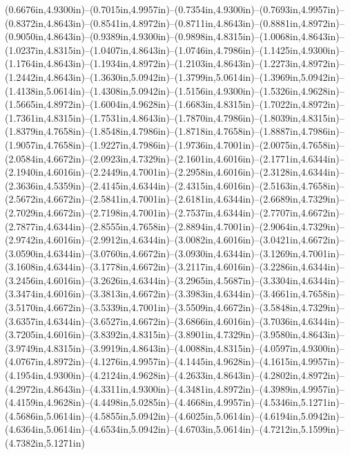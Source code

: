 (0.6676in,4.9300in)--(0.7015in,4.9957in)--(0.7354in,4.9300in)--(0.7693in,4.9957in)--(0.8372in,4.8643in)--(0.8541in,4.8972in)--(0.8711in,4.8643in)--(0.8881in,4.8972in)--(0.9050in,4.8643in)--(0.9389in,4.9300in)--(0.9898in,4.8315in)--(1.0068in,4.8643in)--(1.0237in,4.8315in)--(1.0407in,4.8643in)--(1.0746in,4.7986in)--(1.1425in,4.9300in)--(1.1764in,4.8643in)--(1.1934in,4.8972in)--(1.2103in,4.8643in)--(1.2273in,4.8972in)--(1.2442in,4.8643in)--(1.3630in,5.0942in)--(1.3799in,5.0614in)--(1.3969in,5.0942in)--(1.4138in,5.0614in)--(1.4308in,5.0942in)--(1.5156in,4.9300in)--(1.5326in,4.9628in)--(1.5665in,4.8972in)--(1.6004in,4.9628in)--(1.6683in,4.8315in)--(1.7022in,4.8972in)--(1.7361in,4.8315in)--(1.7531in,4.8643in)--(1.7870in,4.7986in)--(1.8039in,4.8315in)--(1.8379in,4.7658in)--(1.8548in,4.7986in)--(1.8718in,4.7658in)--(1.8887in,4.7986in)--(1.9057in,4.7658in)--(1.9227in,4.7986in)--(1.9736in,4.7001in)--(2.0075in,4.7658in)--(2.0584in,4.6672in)--(2.0923in,4.7329in)--(2.1601in,4.6016in)--(2.1771in,4.6344in)--(2.1940in,4.6016in)--(2.2449in,4.7001in)--(2.2958in,4.6016in)--(2.3128in,4.6344in)--(2.3636in,4.5359in)--(2.4145in,4.6344in)--(2.4315in,4.6016in)--(2.5163in,4.7658in)--(2.5672in,4.6672in)--(2.5841in,4.7001in)--(2.6181in,4.6344in)--(2.6689in,4.7329in)--(2.7029in,4.6672in)--(2.7198in,4.7001in)--(2.7537in,4.6344in)--(2.7707in,4.6672in)--(2.7877in,4.6344in)--(2.8555in,4.7658in)--(2.8894in,4.7001in)--(2.9064in,4.7329in)--(2.9742in,4.6016in)--(2.9912in,4.6344in)--(3.0082in,4.6016in)--(3.0421in,4.6672in)--(3.0590in,4.6344in)--(3.0760in,4.6672in)--(3.0930in,4.6344in)--(3.1269in,4.7001in)--(3.1608in,4.6344in)--(3.1778in,4.6672in)--(3.2117in,4.6016in)--(3.2286in,4.6344in)--(3.2456in,4.6016in)--(3.2626in,4.6344in)--(3.2965in,4.5687in)--(3.3304in,4.6344in)--(3.3474in,4.6016in)--(3.3813in,4.6672in)--(3.3983in,4.6344in)--(3.4661in,4.7658in)--(3.5170in,4.6672in)--(3.5339in,4.7001in)--(3.5509in,4.6672in)--(3.5848in,4.7329in)--(3.6357in,4.6344in)--(3.6527in,4.6672in)--(3.6866in,4.6016in)--(3.7036in,4.6344in)--(3.7205in,4.6016in)--(3.8392in,4.8315in)--(3.8901in,4.7329in)--(3.9580in,4.8643in)--(3.9749in,4.8315in)--(3.9919in,4.8643in)--(4.0088in,4.8315in)--(4.0597in,4.9300in)--(4.0767in,4.8972in)--(4.1276in,4.9957in)--(4.1445in,4.9628in)--(4.1615in,4.9957in)--(4.1954in,4.9300in)--(4.2124in,4.9628in)--(4.2633in,4.8643in)--(4.2802in,4.8972in)--(4.2972in,4.8643in)--(4.3311in,4.9300in)--(4.3481in,4.8972in)--(4.3989in,4.9957in)--(4.4159in,4.9628in)--(4.4498in,5.0285in)--(4.4668in,4.9957in)--(4.5346in,5.1271in)--(4.5686in,5.0614in)--(4.5855in,5.0942in)--(4.6025in,5.0614in)--(4.6194in,5.0942in)--(4.6364in,5.0614in)--(4.6534in,5.0942in)--(4.6703in,5.0614in)--(4.7212in,5.1599in)--(4.7382in,5.1271in)
